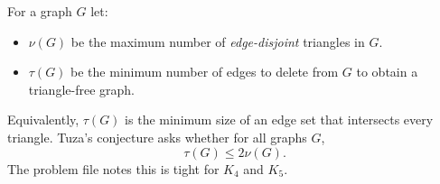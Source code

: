 For a graph $G$ let:
\begin{itemize}
\item $\nu(G)$ be the maximum number of \emph{edge-disjoint} triangles in $G$.
\item $\tau(G)$ be the minimum number of edges to delete from $G$ to obtain a triangle-free graph.
\end{itemize}
Equivalently, $\tau(G)$ is the minimum size of an edge set that intersects every triangle.
Tuza's conjecture asks whether for all graphs $G$,
\[
\tau(G)\le 2\nu(G).
\]
The problem file notes this is tight for $K_4$ and $K_5$.
